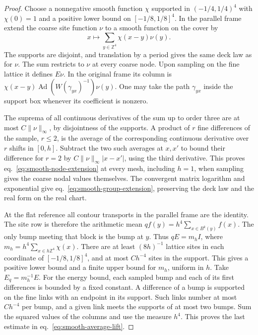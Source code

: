 \documentclass[11pt,letterpaper,reqno]{amsart}
\numberwithin{equation}{section}
\renewcommand{\eqref}[1]{\textup{eq.~\ref{#1}}}
\theoremstyle{definition}
\theoremstyle{remark}
\begin{document}
\begin{proof}
Choose a nonnegative smooth function \(\chi\) supported in
\((-1/4,1/4)^4\) with \(\chi(0)=1\) and a positive lower bound
on \([-1/8,1/8]^4\). In the parallel frame
extend the coarse site function \(\nu\) to a smooth function
on the cover by
\[
                 x\longmapsto\sum_{y\in\mathbb Z^4}\chi(x-y)\nu(y).
\]
The supports are disjoint, and translation by a period gives
the same deck law as for \(\nu\). The sum restricts to \(\nu\)
at every coarse node. Upon sampling on the fine lattice it
defines \(E\nu\). In the original frame its column is
\(\chi(x-y)\operatorname{Ad}(W(\gamma_{yx})^{-1})\nu(y)\).
One may take the path \(\gamma_{yx}\) inside the support box
whenever its coefficient is nonzero.

The suprema of all continuous derivatives of the sum up to
order three are at most \(C\|\nu\|_\infty\), by disjointness
of the supports. A product of \(r\) fine differences of the
sample, \(r\leq2\), is the average of the corresponding
continuous derivative over \(r\) shifts in \([0,h]\).
Subtract the two such averages at \(x,x'\) to bound their
difference for \(r=2\) by \(C\|\nu\|_\infty|x-x'|\), using
the third derivative. This proves \eqref{eq:smooth-node-extension}
at every mesh, including \(h=1\), when sampling gives the
coarse nodal values themselves. The convergent matrix logarithm
and exponential give \eqref{eq:smooth-group-extension}, preserving
the deck law and the real form on the real chart.

At the flat reference all contour transports in the parallel frame
are the identity. The site row is therefore the arithmetic mean
\(qf(y)=h^4\sum_{x\in B^k(y)}f(x)\).
The only bump meeting that block is the bump at \(y\). Thus
\(qE=m_h I\), where \(m_h=h^4\sum_{x\in h\mathbb Z^4}\chi(x)\).
There are at least \((8h)^{-1}\) lattice sites in each coordinate
of \([-1/8,1/8]^4\), and at most \(C h^{-4}\) sites in the support.
This gives a positive lower bound and a finite upper bound for
\(m_h\), uniform in \(h\). Take \(E_q=m_h^{-1}E\).
For the energy bound, each sampled bump and each of its first
differences is bounded by a fixed constant. A difference of
a bump is supported on the fine links with an endpoint in its
support. Such links number at most \(C h^{-4}\) per bump,
and a given link meets the supports of at most two bumps.
Sum the squared values of the columns and use the measure \(h^4\).
This proves the last estimate in \eqref{eq:smooth-average-lift}.
\end{proof}
\end{document}
